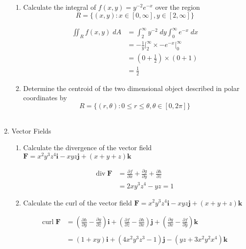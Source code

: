 \documentclass[a4paper,11pt]{article}
\begin{document}
\begin{preview}
\begin{enumerate}
\begin{enumerate}
    \item Calculate the integral of $f(x,y) = y^{-2}e^{-x}$ over the region
    $$ R = \{ (x,y): x \in [0,\infty], y \in [2,\infty]\} $$

    \begin{align*}
        \iint_R f(x,y) \; dA &= \int_{2}^{\infty} y^{-2} \;dy \int_{0}^{\infty} e^{-x} \;dx\\
        &= -\frac{1}{y}\Big|_{2}^{\infty}  \times -e^{-x}\Big|_{0}^{\infty} \\
        &= \left( 0 + \frac{1}{2} \right) \times \left( 0 + 1 \right)\\
        &= \frac{1}{2}
    \end{align*}

    \item Determine the centroid of the two dimensional object described in polar coordinates by
    $$ R = \{ (r, \theta): 0 \leq r \leq \theta, \theta \in [0, 2\pi] \} $$\\



\end{enumerate}

\item Vector Fields

\begin{enumerate}
    \item Calculate the divergence of the vector field $\textbf{F} = x^2y^3z^4 \textbf{i} - xyz \textbf{j} + (x+y+z) \textbf{k}$
    
    \begin{align*}
        \mathrm{div} \; \textbf{F} &= \frac{\partial f}{\partial x } + \frac{\partial g}{\partial y } + \frac{\partial h}{\partial z }\\
        &= 2xy^3z^4 -yz=1
    \end{align*}

    \item Calculate the curl of the vector field $\textbf{F} = x^2y^3z^4 \textbf{i} - xyz \textbf{j} + (x+y+z) \textbf{k}$
    
    \begin{align*}
        \mathrm{curl} \; \textbf{F} &= \left( \frac{\partial h}{\partial y} - \frac{\partial g}{\partial z} \right) \textbf{i} + \left( \frac{\partial f}{\partial z} - \frac{\partial h}{\partial x} \right) \textbf{j} + \left( \frac{\partial g}{\partial x} - \frac{\partial f}{\partial y} \right) \textbf{k}\\\\
        &= \left( 1 + xy \right) \textbf{i} + \left( 4x^2y^3z^3 - 1 \right) \textbf{j} - \left( yz + 3x^2y^2x^4 \right) \textbf{k}\\
    \end{align*}


\end{enumerate}
\end{enumerate}
\end{preview}
\end{document}

